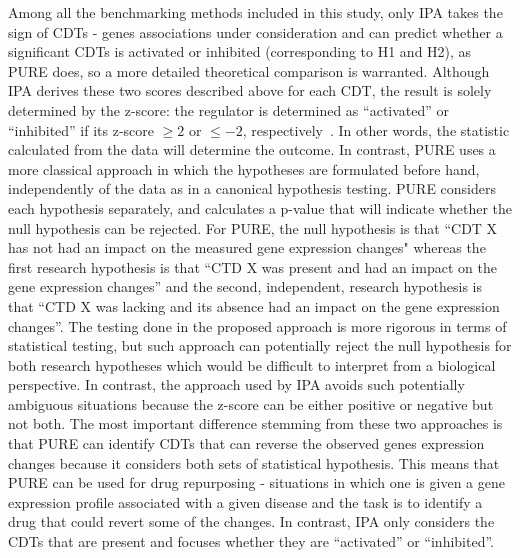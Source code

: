 \documentclass[Minh_PhD_thesis.tex]{subfiles}
\begin{document}
Among all the benchmarking methods included in this study, only IPA takes the sign of CDTs - genes associations under consideration and can predict whether a significant CDTs is activated or inhibited (corresponding to H1 and H2), as PURE does, so a more detailed theoretical comparison is warranted.
Although IPA derives these two scores  described above for each CDT, the result is solely determined by the z-score: the regulator is determined as ``activated''  or ``inhibited'' if its z-score $\geq 2$ or $\leq -2$, respectively~\cite{kramer2013causal}. In other words, the statistic calculated from the data will determine the outcome. In contrast, PURE uses a more classical approach in which the hypotheses are formulated before hand, independently of the data as in a canonical hypothesis testing. PURE considers each hypothesis separately, and calculates a p-value that will indicate whether the null hypothesis can be rejected. 
For PURE, the null hypothesis is that ``CDT X has not had an impact on the measured gene expression changes" whereas the first research hypothesis is that ``CTD X was present and had an impact on the gene expression changes'' and the second, independent, research hypothesis is that ``CTD X was lacking and its absence had an impact on the gene expression changes''. 
The testing done in the proposed approach is more rigorous in terms of statistical testing, but such approach can potentially reject the null hypothesis for both research hypotheses which would be difficult to interpret from a biological perspective. In contrast, the approach used by IPA avoids such potentially ambiguous situations because the z-score can be either positive or negative but not both. The most important difference stemming from these two approaches is that PURE can identify CDTs that can reverse the observed genes expression changes because it considers both sets of statistical hypothesis. This means that PURE can be used for drug repurposing - situations in which one is given a   gene expression profile associated with a given disease and the task is to identify a drug that could revert some of the changes. In contrast, IPA only considers the CDTs that are present and focuses whether they are ``activated'' or ``inhibited''. 
\end{document}
